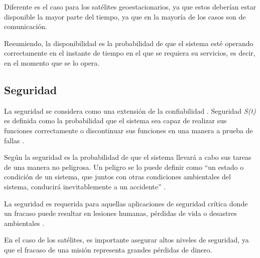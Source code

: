 Diferente es el caso para los satélites geoestacionarios, ya que estos deberían estar disponible la
mayor parte del tiempo, ya que en la mayoría de los casos son de comunicación.

Resumiendo, la disponibilidad es la probabilidad de que el sistema esté operando correctamente en el instante de tiempo en el que se requiera su servicios, es decir, en el momento que se lo opera. 

\subsection{Seguridad}\label{subsec:seguridad}
La seguridad se considera como una extensión de la confiabilidad \citep{FTDesign}. Seguridad
\textit{S(t)} es definida como la probabilidad que el sistema sea capaz de realizar sus funciones
correctamente o discontinuar sus funciones en una manera a prueba de fallas \citep{FTDesign}.

Según \cite{SoftwareFaultToleranceATutorial} la seguridad es la probabilidad de que el sistema
llevará a cabo sus tareas de una manera no peligrosa. Un peligro se lo puede definir como ``un
estado o condición de un sistema, que juntos con otras condiciones ambientales del sistema,
conducirá inevitablemente a un accidente'' \citep{SoftwareFaultToleranceATutorial}.

La seguridad es requerida para aquellas aplicaciones de seguridad crítica donde un fracaso puede
resultar en lesiones humanas, pérdidas de vida o desastres ambientales \citep{FTDesign}.

En el caso de los satélites, es importante asegurar altos niveles de seguridad, ya que
el fracaso de una misión representa grandes pérdidas de dinero. 
